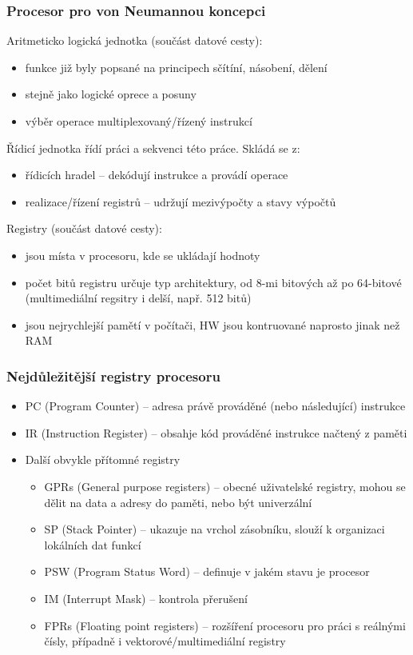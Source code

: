 \begin{frame}
\frametitle{Procesor pro von Neumannou koncepci}

Aritmeticko logická jednotka (součást datové cesty):
\begin{itemize}
\item funkce již byly popsané na principech sčítíní, násobení, dělení
\item stejně jako logické oprece a posuny
\item výběr operace multiplexovaný/řízený instrukcí
\end{itemize}

Řídicí jednotka řídí práci a sekvenci této práce. Skládá se z:
\begin{itemize}
\item řídicích hradel -- dekódují instrukce a provádí operace
\item realizace/řízení registrů -- udržují mezivýpočty a stavy výpočtů
\end{itemize}

Registry (součást datové cesty):
\begin{itemize}
\item jsou místa v procesoru, kde se ukládají hodnoty
\item počet bitů registru určuje typ architektury, od 8-mi bitových až po 64-bitové (multimediální regsitry i delší, např. 512 bitů)
\item jsou nejrychlejší pamětí v počítači, HW jsou kontruované naprosto jinak než RAM
\end{itemize}

\end{frame}


\begin{frame}
\frametitle{Nejdůležitější registry procesoru}
\begin{itemize}
\item PC (Program Counter) -- adresa právě prováděné (nebo následující) instrukce
\item IR (Instruction Register) -- obsahje kód prováděné instrukce načtený z paměti
\item Další obvykle přítomné registry
\begin{itemize}
\item GPRs (General purpose registers) -- obecné uživatelské registry, mohou se dělit na data a adresy do paměti, nebo být univerzální
\item SP (Stack Pointer) -- ukazuje na vrchol zásobníku, slouží k organizaci lokálních dat funkcí
\item PSW (Program Status Word) -- definuje v jakém stavu je procesor
\item IM (Interrupt Mask) -- kontrola přerušení
\item FPRs (Floating point registers) -- rozšíření procesoru pro práci s reálnými čísly, případně i vektorové/multimediální registry
\end{itemize}
\end{itemize}
\end{frame}

